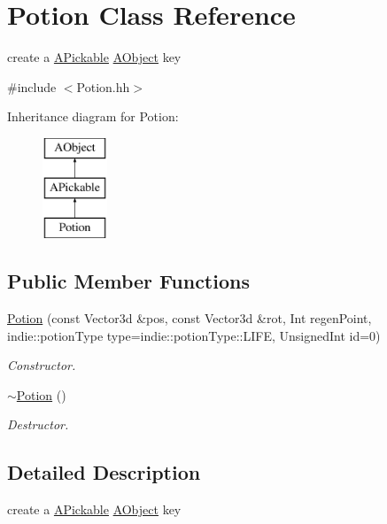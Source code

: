 \hypertarget{classPotion}{}\section{Potion Class Reference}
\label{classPotion}


create a \hyperlink{classAPickable}{A\+Pickable} \hyperlink{classAObject}{A\+Object} key  




{\ttfamily \#include $<$Potion.\+hh$>$}

Inheritance diagram for Potion\+:\begin{figure}[H]
\begin{center}
\leavevmode
\includegraphics[height=3.000000cm]{classPotion}
\end{center}
\end{figure}
\subsection*{Public Member Functions}
\begin{DoxyCompactItemize}
\item 
\hyperlink{classPotion_aff0f8a0f2541246476e30be3eaed1351}{Potion} (const Vector3d \&pos, const Vector3d \&rot, Int regen\+Point, indie\+::potion\+Type type=indie\+::potion\+Type\+::\+L\+I\+FE, Unsigned\+Int id=0)
\begin{DoxyCompactList}\small\item\em Constructor. \end{DoxyCompactList}\item 
\hyperlink{classPotion_a8730c8052ec698171885bb5dacda9cca}{$\sim$\+Potion} ()
\begin{DoxyCompactList}\small\item\em Destructor. \end{DoxyCompactList}\end{DoxyCompactItemize}


\subsection{Detailed Description}
create a \hyperlink{classAPickable}{A\+Pickable} \hyperlink{classAObject}{A\+Object} key 

